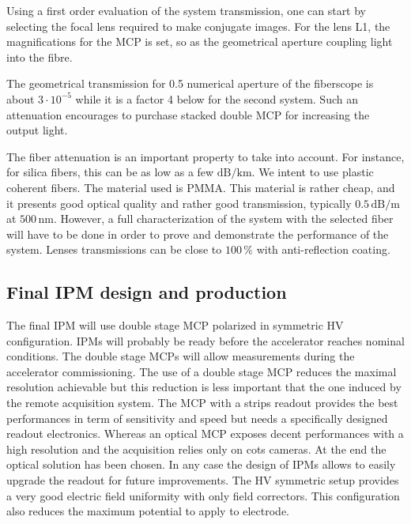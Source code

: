 

Using a first order evaluation of the system transmission, one can start by selecting the focal lens required to make conjugate images. For the lens L1, the magnifications for the MCP is set, so as the geometrical aperture coupling light into the fibre.

The geometrical transmission for 0.5 numerical aperture of the fiberscope is about $3 \cdot 10^{-5}$ while it is a factor 4 below for the second system. Such an attenuation encourages to purchase stacked double MCP for increasing the output light.

The fiber attenuation is an important property to take into account. For instance, for silica fibers, this can be as low as a few $\mathrm{dB/km}$. We intent to use plastic coherent fibers. The material used is PMMA. This material is rather cheap, and it presents good optical quality and rather good transmission, typically $0.5\,\mathrm{dB/m}$ at $500\,\mathrm{nm}$. However, a full characterization of the system with the selected fiber will have to be done in order to prove and demonstrate the performance of the system. Lenses transmissions can be close to $100\,\mathrm{\%}$ with anti-reflection coating.

\subsection*{Final IPM design and production}

%

The final IPM will use double stage MCP polarized in symmetric HV configuration.
IPMs will probably be ready before the accelerator reaches nominal conditions.
The double stage MCPs will allow measurements during the accelerator commissioning. The use of a double stage MCP reduces the maximal resolution achievable but this reduction is less important that the one induced by the remote acquisition system. The MCP with a strips readout provides the best performances in term of sensitivity and speed but needs a specifically designed readout electronics. Whereas an optical  MCP exposes decent performances with a high resolution and the acquisition relies only on \acrshort{cots} cameras. At the end the optical solution has been chosen. In any case the design of IPMs allows to easily upgrade the readout for future improvements.
The HV symmetric setup provides a very good electric field uniformity with only field correctors. This configuration also reduces the maximum potential to apply to electrode. 

